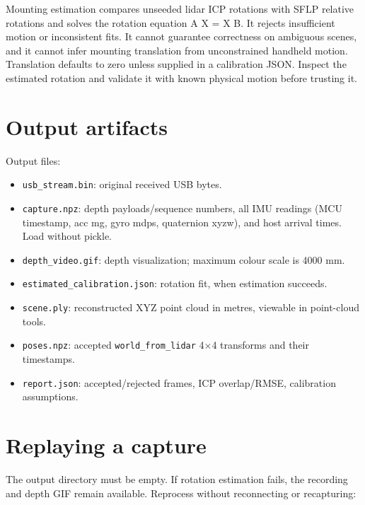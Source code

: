 \documentclass[10pt,a4paper,oneside]{report}
\providecommand{\tightlist}{\setlength{\itemsep}{1pt}\setlength{\parskip}{1pt}}
\begin{document}
Mounting estimation compares unseeded lidar ICP rotations with SFLP relative rotations and solves the rotation equation A X = X B. It rejects insufficient motion or inconsistent fits. It cannot guarantee correctness on ambiguous scenes, and it cannot infer mounting translation from unconstrained handheld motion. Translation defaults to zero unless supplied in a calibration JSON. Inspect the estimated rotation and validate it with known physical motion before trusting it.

\section{Output artifacts}\label{wiki-tools-scene-reconstruction--output-artifacts}

Output files:

\begin{itemize}
\tightlist
\item
  \texttt{usb\_\allowbreak{}stream.\allowbreak{}bin}: original received USB bytes.
\item
  \texttt{capture.\allowbreak{}npz}: depth payloads/sequence numbers, all IMU readings (MCU timestamp, acc mg, gyro mdps, quaternion xyzw), and host arrival times. Load without pickle.
\item
  \texttt{depth\_\allowbreak{}video.\allowbreak{}gif}: depth visualization; maximum colour scale is 4000 mm.
\item
  \texttt{estimated\_\allowbreak{}calibration.\allowbreak{}json}: rotation fit, when estimation succeeds.
\item
  \texttt{scene.\allowbreak{}ply}: reconstructed XYZ point cloud in metres, viewable in point-cloud tools.
\item
  \texttt{poses.\allowbreak{}npz}: accepted \texttt{world\_\allowbreak{}from\_\allowbreak{}lidar} 4×4 transforms and their timestamps.
\item
  \texttt{report.\allowbreak{}json}: accepted/rejected frames, ICP overlap/RMSE, calibration assumptions.
\end{itemize}

\section{Replaying a capture}\label{wiki-tools-scene-reconstruction--replaying-a-capture}

The output directory must be empty. If rotation estimation fails, the recording and depth GIF remain available. Reprocess without reconnecting or recapturing:
\end{document}

